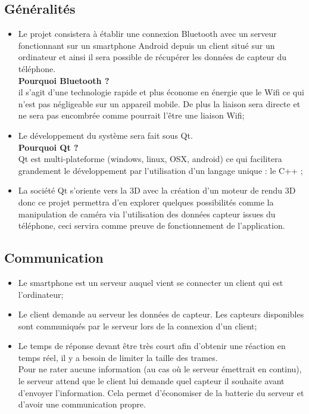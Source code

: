 \subsection{Généralités}

\begin{itemize}
\item  Le projet consistera à établir une connexion Bluetooth avec un serveur fonctionnant sur un smartphone Android depuis un client situé sur un ordinateur et ainsi il sera possible de récupérer les données de capteur du téléphone. \\
\textbf{Pourquoi Bluetooth ?}\\
il s'agit d'une technologie rapide et plus économe en énergie que le Wifi ce qui n'est pas négligeable sur un appareil mobile. De plus la liaison sera directe et ne sera pas encombrée comme pourrait l'être une liaison Wifi;

\item Le développement du système sera fait sous Qt.\\
\textbf{Pourquoi Qt ?}\\
Qt est multi-plateforme (windows, linux, OSX, android) ce qui facilitera grandement le développement par l'utilisation d'un langage unique : le C++ ;\\

\item La société Qt s'oriente vers la 3D avec la création d'un moteur de rendu 3D donc ce projet permettra d'en explorer quelques possibilités comme la manipulation de caméra via l'utilisation des données capteur issues du téléphone, ceci servira comme preuve de fonctionnement de l'application.\\
\end{itemize}

\subsection{Communication}
\begin{itemize}
\item Le smartphone est un serveur auquel vient se connecter un client qui est l'ordinateur;\\

\item Le client demande au serveur les données de capteur. Les capteurs disponibles sont communiqués par le serveur lors de la connexion d'un client; \\

\item Le temps de réponse devant être très court afin d'obtenir une réaction en temps réel, il y a besoin de limiter la taille des trames.\\
Pour ne rater aucune information (au cas où le serveur émettrait en continu), le serveur attend que le client lui demande quel capteur il souhaite avant d'envoyer l'information. Cela permet d'économiser de la batterie du serveur et d'avoir une communication propre. 
\end{itemize}


